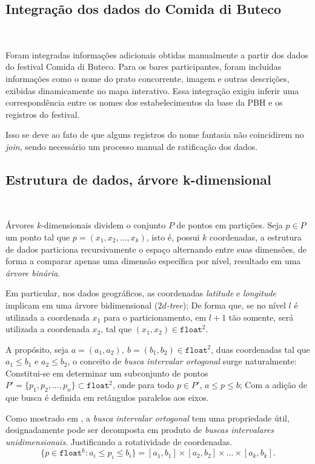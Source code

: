 \documentclass{article}
\begin{document}
\begin{adjustwidth}{-1.5cm}{-1.5cm}
\subsection{Integração dos dados do Comida di Buteco}
\ 

Foram integradas informações adicionais obtidas manualmente a partir dos dados do festival Comida di Buteco. Para os bares participantes, foram incluídas informações como o nome do prato concorrente, imagem e outras descrições, exibidas dinamicamente no mapa interativo. Essa integração exigiu inferir uma correspondência entre os nomes dos estabelecimentos da base da PBH e os registros do festival.

Isso se deve ao fato de que alguns registros do nome fantasia não coincidirem no \textit{join}, sendo necessário um processo manual de ratificação dos dados.


\subsection{Estrutura de dados, árvore k-dimensional}
\ 

Árvores \(k\)-dimensionais dividem o conjunto \(P\) de pontos em partições. Seja \(p \in P\) um ponto tal que \(p=(x_1,x_2,...,x_k)\), isto é, possui \(k\) coordenadas, a estrutura de dados particiona recursivamente o espaço alternando entre suas dimensões, de forma a comparar apenas uma dimensão específica por nível, resultado em uma \textit{árvore binária}.

Em particular, nos dados geográficos, as coordenadas \textit{latitude} e \textit{longitude} implicam em uma árvore bidimensional (\(2d\)\textit{-tree}); De forma que, se no nível \(l\) é utilizada a coordenada \(x_1\) para o particionamento, em \(l+1\) tão somente, será utilizada a coordenada \(x_2\), tal que \((x_1,x_2) \in \texttt{float}^2\).

A propósito, seja \(a=(a_1,a_2),\ b=(b_1,b_2) \in \texttt{float}^2\), duas coordenadas tal que \(a_1\leq b_1\) e \(a_2 \leq b_2\), o conceito de \textit{busca intervalar ortogonal} surge naturalmente: Constitui-se em determinar um subconjunto de pontos \(P'=\{p_1,p_2,...,p_n\} \subset \texttt{float}^2\), onde 
para todo \(p \in P'\), \(a \leq p \leq b\); Com a adição de que busca é definida em retângulos paralelos aos eixos.

Como mostrado em \cite{md}, a \textit{busca intervalar ortogonal} tem uma propriedade útil, designadamente pode ser decomposta em produto de \textit{buscas intervalares unidimensionais}. Justificando a rotatividade de coordenadas.
\[\{p \in \texttt{float}^k : a_i \leq p_i \leq b_i\} = [a_1,b_1] \times[a_2,b_2] \times ... \times [a_k, b_k].\]


\end{adjustwidth}
\end{document}
